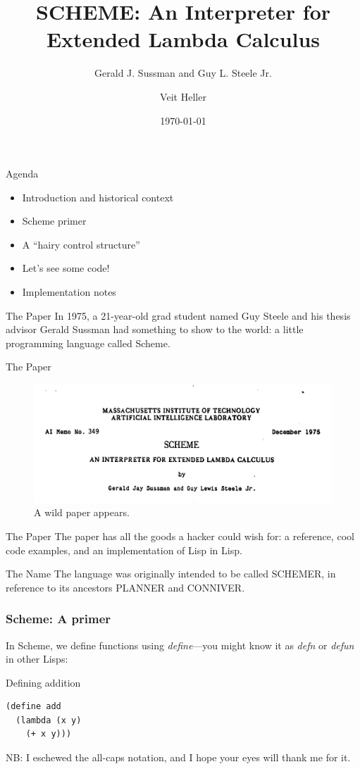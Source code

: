 \documentclass[aspectratio=169]{beamer}
\title{SCHEME: An Interpreter for Extended Lambda Calculus}
\subtitle{Gerald J. Sussman and Guy L. Steele Jr.}
\date{\today}
\author{Veit Heller}
\institute{Papers We Love Berlin}
\begin{document}
  \maketitle
  \begin{frame}{Agenda}
    \begin{itemize}
      \item Introduction and historical context
      \item Scheme primer
      \item A “hairy control structure”
      \item Let’s see some code!
      \item Implementation notes
    \end{itemize}
  \end{frame}
  \begin{frame}{The Paper}
    In 1975, a 21-year-old grad student named Guy Steele and his thesis
    advisor Gerald Sussman had something to show to the world: a little
    programming language called Scheme.

  \end{frame}
  \begin{frame}{The Paper}
    \begin{figure}
      \includegraphics[width=\linewidth]{header.png}
      \caption{A wild paper appears.}
    \end{figure}
  \end{frame}
  \begin{frame}{The Paper}
    The paper has all the goods a hacker could wish for: a reference, cool code
    examples, and an implementation of Lisp in Lisp.
  \end{frame}
  \begin{frame}{The Name}
    The language was originally intended to be called SCHEMER, in reference
    to its ancestors PLANNER and CONNIVER.
  \end{frame}
  \begin{frame}[fragile]
    \frametitle{Scheme: A primer}
    In Scheme, we define functions using \textit{define}—you might know it as
    \textit{defn} or \textit{defun} in other Lisps:

    \begin{listing}[H]
      \caption{Defining addition}
      \begin{verbatim}
(define add
  (lambda (x y)
    (+ x y)))
      \end{verbatim}
    \end{listing}

    NB: I eschewed the all-caps notation, and I hope your eyes will thank me
    for it.
  \end{frame}
\end{document}
